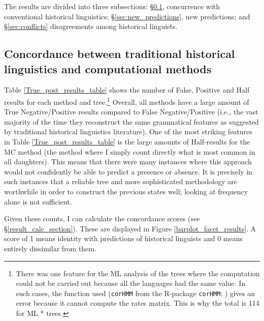 \documentclass[12pt,letterpaper]{article}
\begin{document}
The results are divided into three subsections: §\ref{sec:results_concorance}, concurrence with conventional historical linguistics; §\ref{sec:new_predictions}, new predictions; and §\ref{sec:conflicts} disagreements among historical linguists.

\subsection{Concordance between traditional historical linguistics and computational methods}
\label{sec:results_concorance}




Table \ref{True_post_results_table} shows the number of False, Positive and Half results for each method and tree.\footnote{There was one feature for the ML analysis of the \citet{grayetal_2009} trees where the computation could not be carried out because all the languages had the same value. In such cases, the function used (\texttt{corHMM} from the R-package \texttt{corHMM}; \citealt{R-corHMM}) gives an error because it cannot compute the rates matrix. This is why the total is 114 for ML * \citet{grayetal_2009} trees.} Overall, all methods have a large amount of True Negative/Positive results compared to False Negative/Positive (i.e., the vast majority of the time they reconstruct the same grammatical features as suggested by traditional historical linguistics literature). One of the most striking features in Table \ref{True_post_results_table} is the large amounts of Half-results for the MC method (the method where I simply count directly what is most common in all daughters). This means that there were many instances where this approach would not confidently be able to predict a presence or absence. It is precisely in such instances that a reliable tree and more sophisticated methodology are worthwhile in order to construct the previous states well; looking at frequency alone is not sufficient.



Given these counts, I can calculate the concordance scores (see §\ref{result_calc_section}). These are displayed in Figure \ref{barplot_facet_results}. A score of 1 means identity with predictions of historical linguists and 0 means entirely dissimilar from them.
\end{document}

